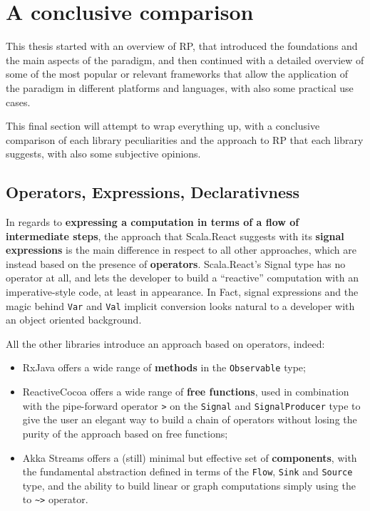\chapter{A conclusive comparison}\label{a-conclusive-comparison}

This thesis started with an overview of RP, that introduced the
foundations and the main aspects of the paradigm, and then continued
with a detailed overview of some of the most popular or relevant
frameworks that allow the application of the paradigm in different
platforms and languages, with also some practical use cases.

This final section will attempt to wrap everything up, with a conclusive
comparison of each library peculiarities and the approach to RP that
each library suggests, with also some subjective opinions.

\section{Operators, Expressions,
Declarativness}\label{operators-expressions-declarativness}

In regards to \textbf{expressing a computation in terms of a flow of
intermediate steps}, the approach that Scala.React suggests with its
\textbf{signal expressions} is the main difference in respect to all
other approaches, which are instead based on the presence of
\textbf{operators}. Scala.React's Signal type has no operator at all,
and lets the developer to build a ``reactive'' computation with an
imperative-style code, at least in appearance. In Fact, signal
expressions and the magic behind \texttt{Var} and \texttt{Val} implicit
conversion looks natural to a developer with an object oriented
background.

All the other libraries introduce an approach based on operators,
indeed:

\begin{itemize}
\itemsep1pt\parskip0pt
\item
  RxJava offers a wide range of \textbf{methods} in the
  \texttt{Observable} type;
\item
  ReactiveCocoa offers a wide range of \textbf{free functions}, used in
  combination with the pipe-forward operator
  \texttt{\textbar{}\textgreater{}} on the \texttt{Signal} and
  \texttt{SignalProducer} type to give the user an elegant way to build
  a chain of operators without losing the purity of the approach based
  on free functions;
\item
  Akka Streams offers a (still) minimal but effective set of
  \textbf{components}, with the fundamental abstraction defined in
  terms of the \texttt{Flow}, \texttt{Sink} and \texttt{Source} type,
  and the ability to build linear or graph computations simply using the
  to \texttt{\textasciitilde{}\textgreater{}} operator.
\end{itemize}

